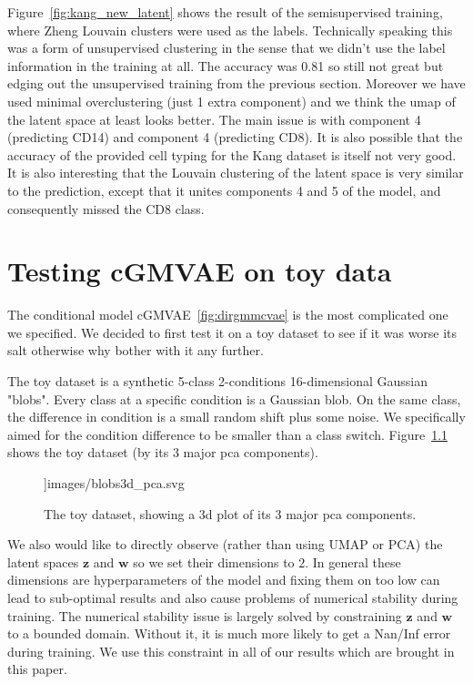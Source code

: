 \documentclass[11pt, a4paper]{report}
\theoremstyle{plain}
\theoremstyle{definition}
\theoremstyle{remark}
\newcommand{\z}{\mathbf{z}}
\newcommand{\w}{\mathbf{w}}
\begin{document}
Figure~\ref{fig:kang_new_latent} shows the result of the semisupervised
training, where Zheng Louvain clusters were used as the labels. Technically
speaking this was a form of unsupervised clustering in the sense that we didn't
use the label information in the training at all. The accuracy was 0.81 so still
not great but edging out the unsupervised training from the previous section.
Moreover we have used minimal overclustering (just 1 extra component) and we
think the umap of the latent space at least looks better. The main issue is with
component 4 (predicting CD14) and component 4 (predicting CD8). It is also
possible that the accuracy of the provided cell typing for the Kang dataset is
itself not very good.
It is also interesting that the Louvain clustering of the latent space is very
similar to the prediction, except that it unites components 4 and 5 of the
model, and consequently missed the CD8 class.

\chapter{Testing cGMVAE on toy data}
The conditional model cGMVAE~\ref{fig:dirgmmcvae} is the most complicated one we
specified. We decided to first test it on a toy dataset to see if it was worse
its salt otherwise why bother with it any further.

The toy dataset is a synthetic 5-class 2-conditions 16-dimensional Gaussian "blobs".
Every class at a specific condition is a Gaussian blob. 
On the same class, the difference in condition is a small random shift plus some
noise. We specifically aimed for the condition difference to be smaller than a
class switch.
Figure~\ref{fig:blobs_3d} shows the toy dataset (by its 3 major pca components).

\begin{figure}[h]
\centering
\textwidth]{images/blobs3d_pca.svg}
\caption{The toy dataset, showing a 3d plot of its 3 major pca components.
}
\label{fig:blobs_3d}
\end{figure}

We also would like to directly observe (rather than using UMAP or PCA) the
latent spaces $\z$ and $\w$ so we set their dimensions to $2$.
In general these dimensions are hyperparameters of the model and fixing them on 
too low can lead to sub-optimal results and also cause problems of numerical
stability during training.
The numerical stability issue is largely solved by constraining $\z$ and $\w$ to
a bounded domain. Without it, 
it is much more likely to get a Nan/Inf error during training.
We use this constraint in all of our results which are brought
in this paper.
\end{document}
